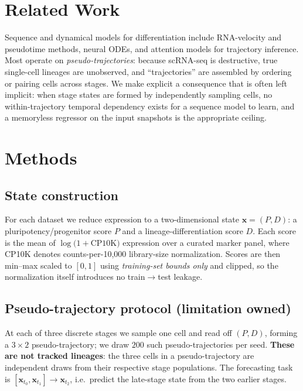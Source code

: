 \documentclass[11pt]{article}
\begin{document}
\section{Related Work}
Sequence and dynamical models for differentiation include RNA-velocity and
pseudotime methods, neural ODEs, and attention models for trajectory inference.
Most operate on \emph{pseudo-trajectories}: because scRNA-seq is destructive, true
single-cell lineages are unobserved, and ``trajectories'' are assembled by ordering
or pairing cells across stages. We make explicit a consequence that is often left
implicit: when stage states are formed by independently sampling cells, no
within-trajectory temporal dependency exists for a sequence model to learn, and a
memoryless regressor on the input snapshots is the appropriate ceiling.

\section{Methods}\label{sec:methods}

\subsection{State construction}
For each dataset we reduce expression to a two-dimensional state
$\mathbf{x}=(P,D)$: a pluripotency/progenitor score $P$ and a
lineage-differentiation score $D$. Each score is the mean of
$\log\!\big(1+\text{CP10K}\big)$ expression over a curated marker panel, where
CP10K denotes counts-per-10{,}000 library-size normalization. Scores are then
min--max scaled to $[0,1]$ using \emph{training-set bounds only} and clipped, so the
normalization itself introduces no train$\rightarrow$test leakage.

\subsection{Pseudo-trajectory protocol (limitation owned)}
At each of three discrete stages we sample one cell and read off $(P,D)$, forming a
$3\times2$ pseudo-trajectory; we draw $200$ such pseudo-trajectories per seed.
\textbf{These are not tracked lineages}: the three cells in a pseudo-trajectory are
independent draws from their respective stage populations. The forecasting task is
$[\mathbf{x}_{t_0},\mathbf{x}_{t_1}]\rightarrow\mathbf{x}_{t_2}$, i.e.\ predict the
late-stage state from the two earlier stages.
\end{document}
